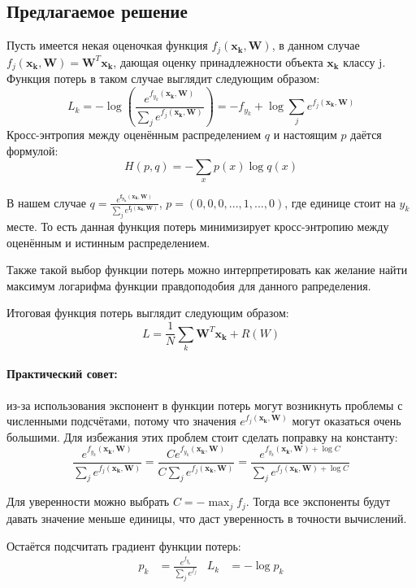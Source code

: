 \documentclass[a4paper]{article}
\newcommand{\xk}{\bm{x_k}}
\newcommand{\W}{\bm{W}}
\begin{document}
\subsection{Предлагаемое решение}
Пусть имеется некая оценочкая функция $f_j(\xk, \W)$, в данном случае $f_j(\xk, \W) = \W^T\xk$, дающая оценку принадлежности объекта $\xk$ классу j. Функция потерь в таком случае выглядит следующим образом:
\begin{equation}
L_k = - \log\left(\frac{e^{f_{y_k}(\xk, \W)}}{\sum_je^{f_j(\xk, \W)}}\right) = 
- f_{y_k} + \log\sum_je^{f_j(\xk, \W)}
\end{equation}
Кросс-энтропия между оценённым распределением $q$ и настоящим $p$ даётся формулой:
\begin{equation}
H(p, q) = - \sum_x p(x)\log q(x)
\end{equation}

В нашем случае $q = \frac{e^{\bm{f_{y_k}(\xk, \W)}}}{\sum_je^{\bm{f_j(\xk, \W)}}}$, $p = (0,0,0,..., 1, ..., 0)$, где единице стоит на $y_k$ месте. То есть данная функция потерь минимизирует кросс-энтропию между оценённым и истинным распределением.

Также такой выбор функции потерь можно интерпретировать как желание найти максимум логарифма функции правдоподобия для данного рапределения.

Итоговая функция потерь выглядит следующим образом:
\begin{equation}
L = \frac{1}{N}\sum_k \W^T\xk + R(W)
\end{equation}

\paragraph*{Практический совет:} из-за использования экспонент в функции потерь могут возникнуть проблемы с численными подсчётами, потому что значения $e^{f_j(\xk, \W)}$ могут оказаться очень большими. Для избежания этих проблем стоит сделать поправку на константу:
\begin{equation}
\frac{e^{f_{y_k}(\xk, \W)}}{\sum_je^{f_j(\xk, \W)}} = \frac{Ce^{f_{y_k}(\xk, \W)}}{C\sum_je^{f_j(\xk, \W)}} = \frac{e^{f_{y_k}(\xk, \W) + \log C}}{\sum_je^{f_j(\xk, \W) + \log C}}
\end{equation}

Для уверенности можно выбрать $C = - \max_jf_j$. Тогда все экспоненты будут давать значение меньше единицы, что даст уверенность в точности вычислений.

Остаётся подсчитать градиент функции потерь:
\begin{align*}
p_k &= \frac{e^{f_{y_k}}}{\sum_je^{f_j}}     &       L_k &= -\log p_k
\end{align*}
\end{document}
